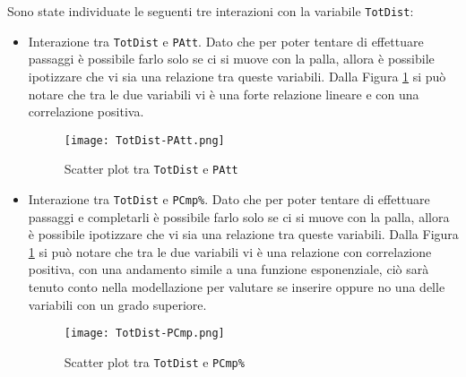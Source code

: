 \pagebreak
Sono state individuate le seguenti tre interazioni con la variabile \texttt{TotDist}:
\begin{itemize}
	\item Interazione tra \texttt{TotDist} e \texttt{PAtt}. Dato che per poter tentare di effettuare passaggi è possibile farlo solo se ci si muove con la palla, allora è possibile ipotizzare che vi sia una relazione tra queste variabili. Dalla Figura \ref{fig:totdistpatt} si può notare che tra le due variabili vi è una forte relazione lineare e con una correlazione positiva.
	\begin{figure}[htbp]
		\begin{center}
			\texttt{[image: TotDist-PAtt.png]}
			\caption{Scatter plot tra \texttt{TotDist} e \texttt{PAtt}}  \label{fig:totdistpatt}
		\end{center}
	\end{figure}
	\item Interazione tra \texttt{TotDist} e \texttt{PCmp\%}. Dato che per poter tentare di effettuare passaggi e completarli è possibile farlo solo se ci si muove con la palla, allora è possibile ipotizzare che vi sia una relazione tra queste variabili. Dalla Figura \ref{fig:totdistpatt} si può notare che tra le due variabili vi è una relazione con correlazione positiva, con una andamento simile a una funzione esponenziale, ciò sarà tenuto conto nella modellazione per valutare se inserire oppure no una delle variabili con un grado superiore.
	\begin{figure}[htbp]
		\begin{center}
			\texttt{[image: TotDist-PCmp.png]}
			\caption{Scatter plot tra \texttt{TotDist} e \texttt{PCmp\%}}  \label{fig:totdistpcmp}
		\end{center}
	\end{figure}
\end{itemize}

